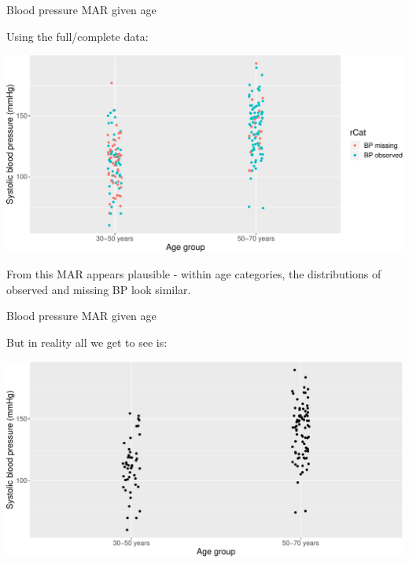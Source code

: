 \documentclass[ignorenonframetext,]{beamer}
\begin{document}
\begin{frame}{Blood pressure MAR given age}
\protect\hypertarget{blood-pressure-mar-given-age}{}

Using the full/complete data:

\includegraphics{Lecture1_files/figure-beamer/unnamed-chunk-5-1.pdf}

From this MAR appears plausible - within age categories, the
distributions of observed and missing BP look similar.

\end{frame}

\begin{frame}{Blood pressure MAR given age}
\protect\hypertarget{blood-pressure-mar-given-age-1}{}

But in reality all we get to see is:

\includegraphics{Lecture1_files/figure-beamer/unnamed-chunk-6-1.pdf}

\end{frame}
\end{document}
